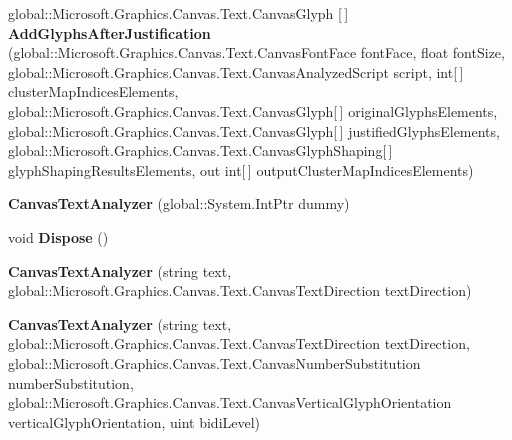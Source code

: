 \begin{DoxyCompactItemize}
\item 
\mbox{\label{class_microsoft_1_1_graphics_1_1_canvas_1_1_text_1_1_canvas_text_analyzer_a56ac0832bd71ab5cce968f4d89e08b44}} 
global\+::\+Microsoft.\+Graphics.\+Canvas.\+Text.\+Canvas\+Glyph \mbox{[}$\,$\mbox{]} {\bfseries Add\+Glyphs\+After\+Justification} (global\+::\+Microsoft.\+Graphics.\+Canvas.\+Text.\+Canvas\+Font\+Face font\+Face, float font\+Size, global\+::\+Microsoft.\+Graphics.\+Canvas.\+Text.\+Canvas\+Analyzed\+Script script, int\mbox{[}$\,$\mbox{]} cluster\+Map\+Indices\+Elements, global\+::\+Microsoft.\+Graphics.\+Canvas.\+Text.\+Canvas\+Glyph\mbox{[}$\,$\mbox{]} original\+Glyphs\+Elements, global\+::\+Microsoft.\+Graphics.\+Canvas.\+Text.\+Canvas\+Glyph\mbox{[}$\,$\mbox{]} justified\+Glyphs\+Elements, global\+::\+Microsoft.\+Graphics.\+Canvas.\+Text.\+Canvas\+Glyph\+Shaping\mbox{[}$\,$\mbox{]} glyph\+Shaping\+Results\+Elements, out int\mbox{[}$\,$\mbox{]} output\+Cluster\+Map\+Indices\+Elements)
\item 
\mbox{\label{class_microsoft_1_1_graphics_1_1_canvas_1_1_text_1_1_canvas_text_analyzer_ac8173f39f6bd783b212836c473af2e2d}} 
{\bfseries Canvas\+Text\+Analyzer} (global\+::\+System.\+Int\+Ptr dummy)
\item 
\mbox{\label{class_microsoft_1_1_graphics_1_1_canvas_1_1_text_1_1_canvas_text_analyzer_a29ec6d38a21ef39bf02be6c27ca74fe9}} 
void {\bfseries Dispose} ()
\item 
\mbox{\label{class_microsoft_1_1_graphics_1_1_canvas_1_1_text_1_1_canvas_text_analyzer_a9b82d9ebaf24510683045414b6ffb1a9}} 
{\bfseries Canvas\+Text\+Analyzer} (string text, global\+::\+Microsoft.\+Graphics.\+Canvas.\+Text.\+Canvas\+Text\+Direction text\+Direction)
\item 
\mbox{\label{class_microsoft_1_1_graphics_1_1_canvas_1_1_text_1_1_canvas_text_analyzer_aea0f6d0276cc0876f6d564ad7663e994}} 
{\bfseries Canvas\+Text\+Analyzer} (string text, global\+::\+Microsoft.\+Graphics.\+Canvas.\+Text.\+Canvas\+Text\+Direction text\+Direction, global\+::\+Microsoft.\+Graphics.\+Canvas.\+Text.\+Canvas\+Number\+Substitution number\+Substitution, global\+::\+Microsoft.\+Graphics.\+Canvas.\+Text.\+Canvas\+Vertical\+Glyph\+Orientation vertical\+Glyph\+Orientation, uint bidi\+Level)

\end{DoxyCompactItemize}
